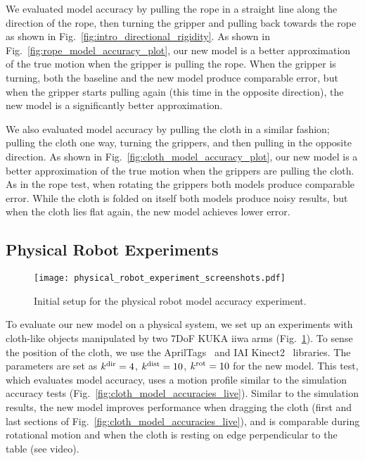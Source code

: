We evaluated model accuracy by pulling the rope in a straight line along the direction of the rope, then turning the gripper and pulling back towards the rope as shown in Fig.~\ref{fig:intro_directional_rigidity}. As shown in Fig.~\ref{fig:rope_model_accuracy_plot}, our new model is a better approximation of the true motion when the gripper is pulling the rope. When the gripper is turning, both the baseline and the new model produce comparable error, but when the gripper starts pulling again (this time in the opposite direction), the new model is a significantly better approximation.

We also evaluated model accuracy by pulling the cloth in a similar fashion; pulling the cloth one way, turning the grippers, and then pulling in the opposite direction. As shown in Fig.~\ref{fig:cloth_model_accuracy_plot}, our new model is a better approximation of the true motion when the grippers are pulling the cloth. As in the rope test, when rotating the grippers both models produce comparable error. While the cloth is folded on itself both models produce noisy results, but when the cloth lies flat again, the new model achieves lower error.



\subsection{Physical Robot Experiments}

\begin{figure}[ht]
    \centering
    \texttt{[image: physical\_robot\_experiment\_screenshots.pdf]}
    \caption{Initial setup for the physical robot model accuracy experiment.}
    \label{fig:physical_experiment_screenshots}
\end{figure}

To evaluate our new model on a physical system, we set up an experiments with cloth-like objects manipulated by two 7DoF KUKA iiwa arms (Fig.~\ref{fig:physical_experiment_screenshots}). To sense the position of the cloth, we use the AprilTags~\cite{olson2011tags} and IAI Kinect2~\cite{iai_kinect2} libraries. The parameters are set as $k^\textrm{dir} = 4$, $k^\textrm{dist} = 10$, $k^{\textrm{rot}} = 10$ for the new model. This test, which evaluates model accuracy, uses a motion profile similar to the simulation accuracy tests (Fig.~\ref{fig:cloth_model_accuracies_live}). Similar to the simulation results, the new model improves performance when dragging the cloth (first and last sections of Fig.~\ref{fig:cloth_model_accuracies_live}), and is comparable during rotational motion and when the cloth is resting on edge perpendicular to the table (see video).


